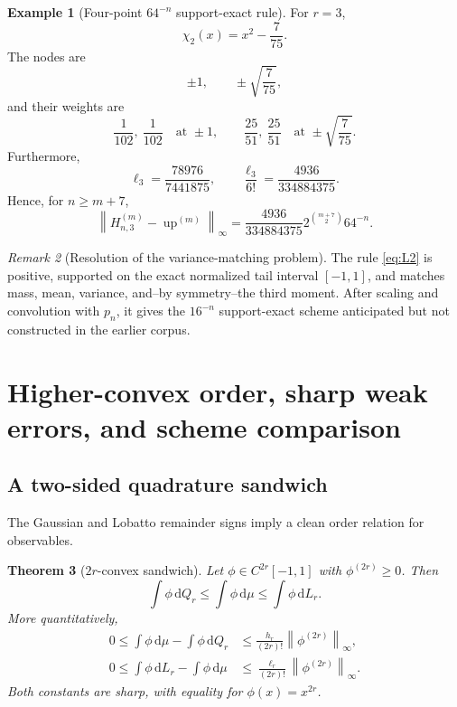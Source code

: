 \documentclass[11pt]{article}
\numberwithin{equation}{section}
\newtheorem{theorem}{Theorem}[section]
\theoremstyle{definition}
\newtheorem{example}[theorem]{Example}
\theoremstyle{remark}
\newtheorem{remark}[theorem]{Remark}
\newcommand{\Up}{\operatorname{up}}
\newcommand{\dd}{\,\mathrm d}
\newcommand{\norm}[1]{\left\lVert#1\right\rVert}
\begin{document}
\begin{example}[Four-point $64^{-n}$ support-exact rule]
For $r=3$,
\[
 \chi_2(x)=x^2-\frac7{75}.
\]
The nodes are
\begin{equation}
 \pm1,\qquad \pm\sqrt{\frac7{75}},
 \label{eq:L3-nodes}
\end{equation}
and their weights are
\begin{equation}
 \frac1{102},\ \frac1{102}
 \quad\text{at }\pm1,
 \qquad
 \frac{25}{51},\ \frac{25}{51}
 \quad\text{at }\pm\sqrt{\frac7{75}}.
 \label{eq:L3-weights}
\end{equation}
Furthermore,
\[
 \ell_3=\frac{78976}{7441875},
 \qquad
 \frac{\ell_3}{6!}=\frac{4936}{334884375}.
\]
Hence, for $n\ge m+7$,
\begin{equation}
 \boxed{
 \norm{H_{n,3}^{(m)}-\Up^{(m)}}_\infty
 =\frac{4936}{334884375}
 2^{\binom{m+7}{2}}64^{-n}.}
 \label{eq:Hn3-error}
\end{equation}
\end{example}

\begin{remark}[Resolution of the variance-matching problem]
The rule \eqref{eq:L2} is positive, supported on the exact normalized tail interval $[-1,1]$, and matches mass, mean, variance, and--by symmetry--the third moment.  After scaling and convolution with $p_n$, it gives the $16^{-n}$ support-exact scheme anticipated but not constructed in the earlier corpus.
\end{remark}

\section{Higher-convex order, sharp weak errors, and scheme comparison}
\label{sec:convex-order}

\subsection{A two-sided quadrature sandwich}

The Gaussian and Lobatto remainder signs imply a clean order relation for observables.

\begin{theorem}[$2r$-convex sandwich]
\label{thm:sandwich}
Let $\phi\in C^{2r}[-1,1]$ with $\phi^{(2r)}\ge0$.  Then
\begin{equation}
 \boxed{
 \int\phi\dd Q_r
 \le \int\phi\dd\mu
 \le \int\phi\dd L_r.}
 \label{eq:sandwich}
\end{equation}
More quantitatively,
\begin{align}
 0\le \int\phi\dd\mu-\int\phi\dd Q_r
 &\le \frac{h_r}{(2r)!}\norm{\phi^{(2r)}}_\infty,
 \label{eq:G-weak-bound}\\
 0\le \int\phi\dd L_r-\int\phi\dd\mu
 &\le \frac{\ell_r}{(2r)!}\norm{\phi^{(2r)}}_\infty.
 \label{eq:L-weak-bound}
\end{align}
Both constants are sharp, with equality for $\phi(x)=x^{2r}$.
\end{theorem}
\end{document}
